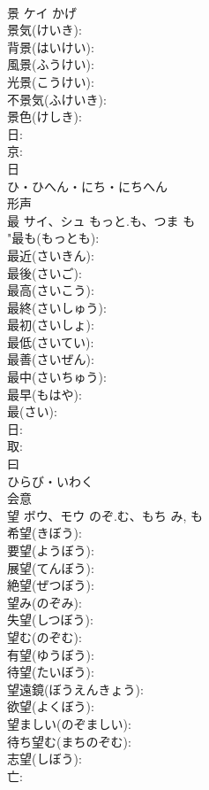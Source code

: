 \documentclass[8pt]{extreport}
\begin{document}
\begin{CJK}{UTF8}{min}
\\	景	ケイ		かげ	
\\	景気(けいき): 
\\	背景(はいけい): 
\\	風景(ふうけい): 
\\	光景(こうけい): 
\\	不景気(ふけいき): 
\\	景色(けしき): 
\\	日: 
\\	京: 
\\	日	
\\	ひ・ひへん・にち・にちへん	
\\	形声 
\\	最	サイ、シュ	もっと.も、つま	も	
\\	"最も(もっとも): 
\\	最近(さいきん): 
\\	最後(さいご): 
\\	最高(さいこう): 
\\	最終(さいしゅう): 
\\	最初(さいしょ): 
\\	最低(さいてい): 
\\	最善(さいぜん): 
\\	最中(さいちゅう): 
\\	最早(もはや): 
\\	最(さい): 
\\	日: 
\\	取: 
\\	曰	
\\	ひらび・いわく	
\\	会意 
\\	望	ボウ、モウ	のぞ.む、もち	み, も	
\\	希望(きぼう): 
\\	要望(ようぼう): 
\\	展望(てんぼう): 
\\	絶望(ぜつぼう): 
\\	望み(のぞみ): 
\\	失望(しつぼう): 
\\	望む(のぞむ): 
\\	有望(ゆうぼう): 
\\	待望(たいぼう): 
\\	望遠鏡(ぼうえんきょう): 
\\	欲望(よくぼう): 
\\	望ましい(のぞましい): 
\\	待ち望む(まちのぞむ): 
\\	志望(しぼう): 
\\	亡: 

\end{CJK}
\end{document}
